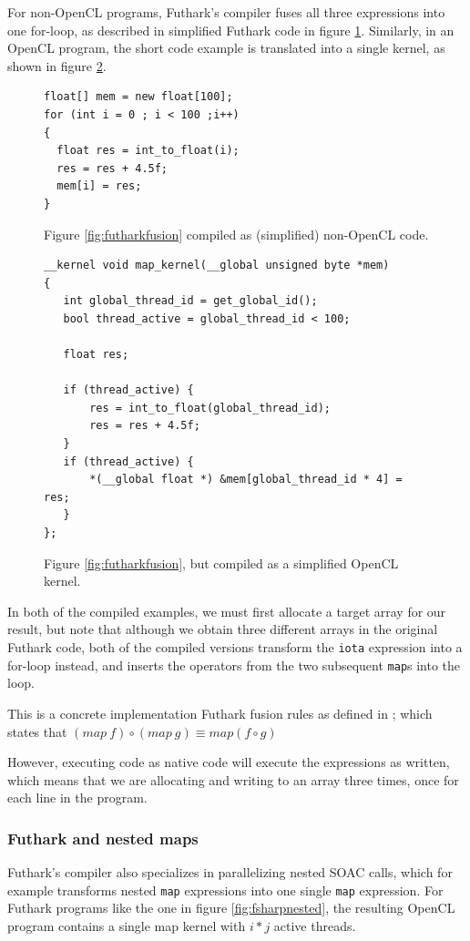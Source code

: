 For non-OpenCL programs, Futhark's compiler fuses all three expressions into one for-loop, as described
in simplified Futhark \csharp{} code in figure \ref{fig:pseudofusion}.
Similarly, in an OpenCL program, the short code example is translated into a
single kernel, as shown in figure \ref{fig:pseudokernel}.

\begin{figure}[h]
  \centering
\begin{verbatim}
float[] mem = new float[100];
for (int i = 0 ; i < 100 ;i++)
{
  float res = int_to_float(i);
  res = res + 4.5f;
  mem[i] = res;
}
\end{verbatim}
  \caption{Figure \ref{fig:futharkfusion} compiled as (simplified) non-OpenCL
    \csharp{} code.}
  \label{fig:pseudofusion}
\end{figure}

\begin{figure}
  \centering
\begin{verbatim}
__kernel void map_kernel(__global unsigned byte *mem)
{
   int global_thread_id = get_global_id();
   bool thread_active = global_thread_id < 100;

   float res;

   if (thread_active) {
       res = int_to_float(global_thread_id);
       res = res + 4.5f;
   }
   if (thread_active) {
       *(__global float *) &mem[global_thread_id * 4] = res;
   }
};
\end{verbatim}
  \caption{Figure \ref{fig:futharkfusion}, but compiled as a simplified OpenCL kernel.}
  \label{fig:pseudokernel}
\end{figure}


In both of the compiled examples, we must first allocate a target array for our
result, but note that although we obtain three different arrays in the original
Futhark code, both of the compiled versions transform the \texttt{iota}
expression into a for-loop instead, and inserts the operators from the two
subsequent \texttt{map}s into the loop.

This is a concrete implementation Futhark fusion rules as defined in \cite{pldi17}; which states
that $(map~f) \circ (map~g) \equiv map (f \circ g)$

However, executing \fshark{} code as native \fsharp{} code will execute the
expressions as written, which means that we are allocating and writing to an
array three times, once for each line in the program.

\subsubsection*{Futhark and nested maps}
Futhark's compiler also specializes in parallelizing nested SOAC
calls\cite{pldi17}, which for example transforms nested \texttt{map} expressions into one
single \texttt{map} expression. For Futhark programs like the one in figure
\ref{fig:fsharpnested}, the resulting OpenCL program contains a single map
kernel with $i * j$ active threads.

